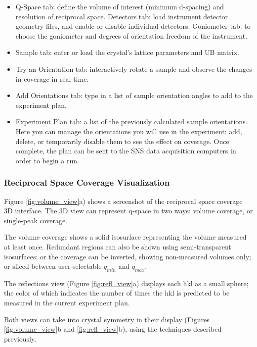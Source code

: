 \documentclass{iucr}              %
\begin{document}
\begin{itemize}
  \item Q-Space tab: define the volume of interest (minimum d-spacing) and
resolution of reciprocal space. Detectors tab: load instrument detector geometry
files, and enable or disable individual detectors. Goniometer tab: to choose the
goniometer and degrees of orientation freedom of the instrument.
   
  \item Sample tab: enter or load the crystal's lattice parameters and UB matrix.

  \item Try an Orientation tab: interactively rotate a sample and observe the
  changes in coverage in real-time.
   
  \item Add Orientations tab: type in a list of sample orientation angles to add
  to the experiment plan.
 
  \item Experiment Plan tab: a list of the previously calculated sample orientations.
Here you can manage the orientations you will use in the experiment: add,
delete, or temporarily disable them to see the effect on coverage. Once
complete, the plan can be sent to the SNS data acquisition computers in order to
begin a run.
    
\end{itemize} 



\subsubsection{Reciprocal Space Coverage Visualization}
Figure \ref{fig:volume_view}a) shows a screenshot of the reciprocal space
coverage 3D interface. The 3D view can represent q-space in two ways: volume coverage, or single-peak
coverage.  

The volume coverage shows a solid isosurface representing the volume measured at
least once. Redundant regions can also be shown using semi-transparent
isosurfaces; or the coverage can be inverted, showing non-measured volumes only;
or sliced between user-selectable $q_{min}$ and $q_{max}$.        

The reflections view (Figure \ref{fig:refl_view}a) displays each hkl as a
small sphere; the color of which indicates the number of times the hkl is predicted to be measured
in the current experiment plan.       

Both views can take into crystal symmetry in their display (Figures
\ref{fig:volume_view}b and \ref{fig:refl_view}b), using the techniques described
previously.
 
\end{document}
